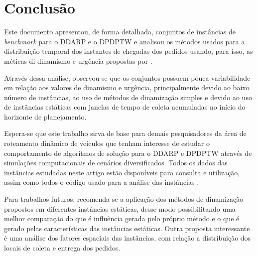 \chapter{Conclusão}\label{ch:conclusao}


Este documento apresentou, de forma detalhada, conjuntos de instâncias de 
\textit{benchmark} para o DDARP e o DPDPTW e analisou os métodos usados para a 
distribuição temporal dos instantes de chegadas dos pedidos usando, para isso,
as méticas di dinamismo e urgência propostas por 
.

Através dessa análise, observou-se que os conjuntos possuem pouca 
variabilidade em relação aos valores de dinamismo e urgência, principalmente 
devido ao baixo número de instâncias, ao uso de métodos de dinamização simples 
e devido ao uso de instâncias estáticas com janelas de tempo de coleta
acumuladas no início do horizonte de planejamento.

Espera-se que este trabalho sirva de base para demais pesquisadores da área de 
roteamento dinâmico de veículos que tenham interesse de estudar o comportamento
de algoritmos de solução para o DDARP e DPDPTW através de simulações 
computacionais de cenários diversificados.
Todos os dados das instâncias estudadas neste artigo estão disponíveis para 
consulta e utilização, assim como todos o código usado para a análise das 
instâncias \cite{eccel_problemas_2019}.

Para trabalhos futuros, recomenda-se a aplicação dos métodos de dinamização
propostos em diferentes instâncias estáticas, desse modo possibilitando uma
melhor comparação do que é influência gerada pelo próprio método e o que é 
gerado pelas características das instâncias estáticas.
Outra proposta interessante é uma análise dos fatores espaciais das 
instâncias, com relação a distribuição dos locais de coleta e entrega dos 
pedidos.
